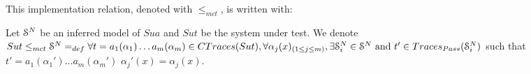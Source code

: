%
%

This implementation relation, denoted with $\leq_{mct}$, is
written with:

\begin{definition}
	\label{impl21}
	 Let $\EuScript{S}^{N}$ be an inferred model of $\mathit{Sua}$ and
	 $\mathit{Sut}$ be the system under test.
	We denote ${Sut} \leq_{mct} \EuScript{S}^{N} =_{def} \forall t=
	a_1(\alpha_1) \dots a_m(\alpha_m) \in CTraces({Sut}), \forall \alpha_j(x)_{(1 \leq j \leq m)}, \exists \EuScript{S}_i^{N} \in \EuScript{S}^{N} \text{ and } t'\in Traces_{Pass}(\EuScript{S}_i^{N})$ such that $t'=a_1(\alpha_1')...a_m(\alpha_m')$  $\alpha_j'(x)=\alpha_j(x)$.
\end{definition}

